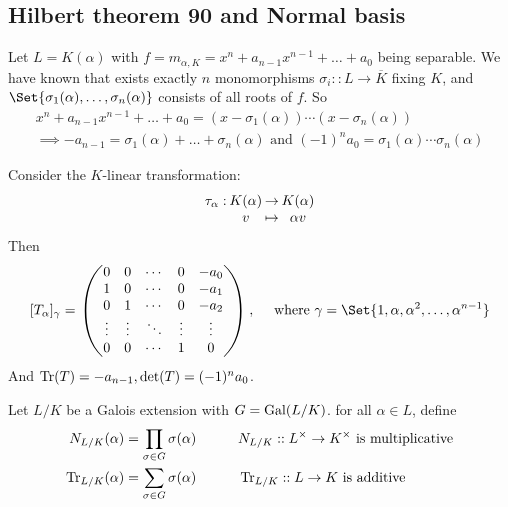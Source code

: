 \subsection{Hilbert theorem 90 and Normal basis}

Let $L = K(\alpha)$ with $f = m_{\alpha, K} = x^n + a_{n-1} x^{n-1} + \dots + a_0$ being separable.
We have known that exists exactly $n$ monomorphisms $\sigma_i :: L \to \overline{K}$ fixing $K$,
and $\Set{\sigma_1(\alpha), \dots, \sigma_n(\alpha)}$ consists of all roots of $f$.
So
\begin{multline*}
  x^n + a_{n-1} x^{n-1} + \dots + a_0 = (x - \sigma_1(\alpha)) \dotsm (x - \sigma_n(\alpha)) \\
  \implies -a_{n-1} = \sigma_1(\alpha) + \dots + \sigma_n(\alpha) \text{ and }
  (-1)^n a_0 = \sigma_1(\alpha) \dotsm \sigma_n(\alpha)
\end{multline*}

Consider the $K$-linear transformation:
\[ \deffunc{\tau_\alpha}{K(\alpha)}{K(\alpha)}{v}{\alpha v} \]
Then
\[ [T_\alpha]_\gamma = \begin{pmatrix}
    0 & 0 & \cdots & 0 & -a_0 \\
    1 & 0 & \cdots & 0 & -a_1 \\
    0 & 1 & \cdots & 0 & -a_2 \\
    \vdots & \vdots & \ddots & \vdots & \vdots \\
    0 & 0 & \cdots & 1 & 0
  \end{pmatrix}, \quad \text{ where } \gamma = \Set{1, \alpha, \alpha^2, \dots, \alpha^{n-1}} \]
And $\operatorname{Tr}(T) = -a_{n-1}, \det(T) = (-1)^n a_0$.

\begin{definition}
  Let $L/K$ be a Galois extension with $G = \operatorname{Gal}(L/K)$.
  for all $\alpha \in L$, define
  \begin{alignat*}{4}
    N_{L/K}(\alpha) &= \prod_{\sigma \in G} \sigma(\alpha) \quad\quad && N_{L/K} :: L^\times \to K^\times
    \text{ is multiplicative} \\
    \operatorname{Tr}_{L/K}(\alpha) &= \sum_{\sigma \in G} \sigma(\alpha) \quad\quad && \operatorname{Tr}_{L/K} :: L \to K
    \text{ is additive}
  \end{alignat*}
\end{definition}

